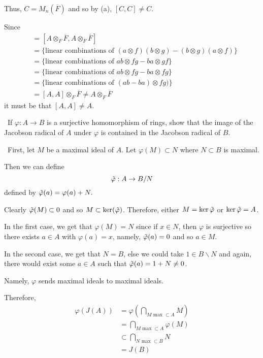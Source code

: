 \documentclass[12pt]{AlgebraQual}
\begin{document}
\begin{solution}
\begin{enumerate}[label=(\alph*)]
    Thus, $C=M_n(\overline{F})$ and so by (a), $[C,C]\not=C$.

    Since \begin{align*}
        [C,C]&=[A\otimes_F\overline{F},A\otimes_F\overline{F}]\\
        &=\{\text{linear combinations of }(a\otimes f)(b\otimes g)-(b\otimes g)(a\otimes f)\}\\
        &=\{\text{linear combinations of }ab\otimes fg-ba\otimes gf\}\\
        &=\{\text{linear combinations of }ab\otimes fg-ba\otimes fg\}\\
        &=\{\text{linear combinations of }(ab-ba)\otimes fg)\}\\
        &=[A,A]\otimes_F\overline{F}\not=A\otimes_F\overline{F}
    \end{align*} it must be that $[A,A]\not=A$.
\end{enumerate}
\end{solution}
\newpage



\begin{problem} $\,$
If $\varphi:A\to B$ is a surjective homomorphism of rings, show that the image of the Jacobson radical of $A$ under $\varphi$ is contained in the Jacobson radical of $B$.
\end{problem}


\begin{solution}$\,$
First, let $M$ be a maximal ideal of $A$. Let $\varphi(M)\subset N$ where $N\subset B$ is maximal.

Then we can define $$\Tilde{\varphi}:A\to B/N$$ defined by $\Tilde{\varphi}(a)=\varphi(a)+N.$

Clearly $\Tilde{\varphi}(M)\subset 0$ and so $M\subset\ker(\Tilde{\varphi})$. Therefore, either $M=\ker\Tilde{\varphi}$ or $\ker\Tilde{\varphi}=A$.

In the first case, we get that $\varphi(M)=N$ since if $x\in N$, then $\varphi$ is surjective so there exists $a\in A$ with $\varphi(a)=x$, namely, $\Tilde{\varphi}(a)=0$ and so $a\in M$.

In the second case, we get that $N=B$, else we could take $1\in B\backslash N$ and again, there would exist some $a\in A$ such that $\Tilde{\varphi}(a)=1+N\not=0$.

Namely, $\varphi$ sends maximal ideals to maximal ideals.

Therefore, \begin{align*}
    \varphi(J(A))&=\varphi\left(\bigcap_{M\text{ max }\subset A}M\right)\\
    &=\bigcap_{M\text{ max }\subset A}\varphi(M)\\
    &\subset \bigcap_{N\text{ max }\subset B}N\\
    &=J(B)
\end{align*}
\end{solution}
\newpage
\end{document}
